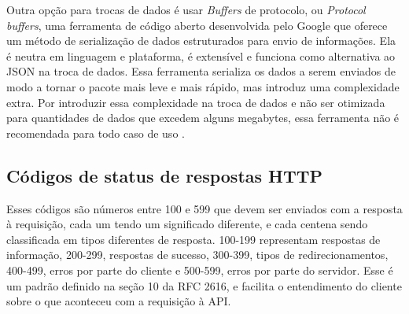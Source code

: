 Outra opção para trocas de dados é usar \emph{Buffers} de protocolo, ou \emph{Protocol buffers}, uma ferramenta de código aberto desenvolvida pelo Google que oferece um método de serialização de dados estruturados para envio de informações. Ela é neutra em linguagem e plataforma, é extensível e funciona como alternativa ao JSON na troca de dados. Essa ferramenta serializa os dados a serem enviados de modo a tornar o pacote mais leve e mais rápido, mas introduz uma complexidade extra. Por introduzir essa complexidade na troca de dados e não ser otimizada para quantidades de dados que excedem alguns megabytes, essa ferramenta não é recomendada para todo caso de uso \cite{google-protocol-buffers}.

\subsection{Códigos de status de respostas HTTP}
Esses códigos são números entre 100 e 599 que devem ser enviados com a resposta à requisição, cada um tendo um significado diferente, e cada centena sendo classificada em tipos diferentes de resposta. 100-199 representam respostas de informação, 200-299, respostas de sucesso, 300-399, tipos de redirecionamentos, 400-499, erros por parte do cliente e 500-599, erros por parte do servidor. Esse é um padrão definido na seção 10 da RFC 2616, e facilita o entendimento do cliente sobre o que aconteceu com a requisição à API. \cite{rfc_http_nielsen_1999}






